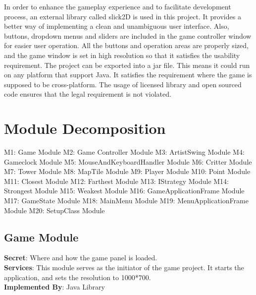 \documentclass[12,english]{article}
\begin{document}
In order to enhance the gameplay experience and to facilitate development process, an external library called slick2D is used in this project. It provides a better way of implementing a clean and unambiguous user interface. Also, buttons, dropdown menus and sliders are included in the game controller window for easier user operation. All the buttons and operation areas are properly sized, and the game window is set in high resolution so that it satisfies the usability requirement. The project can be exported into a jar file. This means it could run on any platform that support Java. It satisfies the requirement where the game is supposed to be cross-platform. The usage of licensed library and open sourced code ensures that the legal requirement is not violated. 


\section{Module Decomposition}
M1: Game Module \newline    
M2: Game Controller Module \newline 
M3: ArtistSwing Module \newline 
M4: Gameclock Module \newline 
M5: MouseAndKeyboardHandler Module \newline 
M6: Critter Module \newline 
M7: Tower Module \newline 
M8: MapTile Module \newline 
M9: Player Module \newline 
M10: Point Module \newline 
M11: Closest Module \newline 
M12: Farthest Module \newline 
M13: IStrategy Module \newline 
M14: Strongest Module \newline 
M15: Weakest Module \newline 
M16: GameApplicationFrame Module \newline 
M17: GameState Module \newline 
M18: MainMenu Module \newline 
M19: MenuApplicationFrame Module \newline 
M20: SetupClass Module \newline 


	\subsection{Game Module}
	\textbf{Secret}: Where and how the game panel is loaded. \\
	\textbf{Services}: This module serves as the initiator of the game project. It starts the application, and sets the resolution to 1000*700. \\
	\textbf{Implemented By}: Java Library
	
\end{document}

